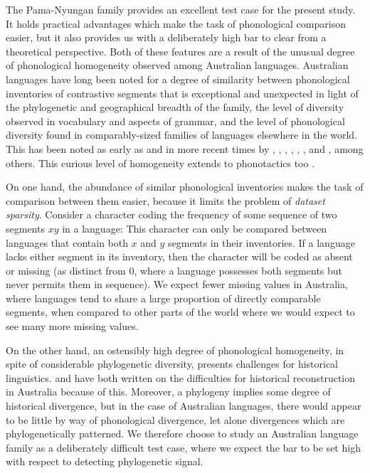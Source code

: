 The Pama-Nyungan family provides an excellent test case for the present study. It holds practical advantages which make the task of phonological comparison easier, but it also provides us with a deliberately high bar to clear from a theoretical perspective. Both of these features are a result of the unusual degree of phonological homogeneity observed among Australian languages. Australian languages have long been noted for a degree of similarity between phonological inventories of contrastive segments that is exceptional and unexpected in light of the phylogenetic and geographical breadth of the family, the level of diversity observed in vocabulary and aspects of grammar, and the level of phonological diversity found in comparably-sized families of languages elsewhere in the world. This has been noted as early as \textcite{schmidt_gliederung_1919} and in more recent times by \textcite{capell_new_1956}, \textcite{voegelin_obtaining_1963}, \textcite{dixon_languages_1980}, \textcite{busby_distribution_1982}, \textcite{hamilton_phonetic_1996}, \textcite{baker_word_2014}, \textcite{bowern_standard_2017} and \textcite{round_segment_2021}, among others. This curious level of homogeneity extends to phonotactics too \autocites{dixon_languages_1980}{hamilton_phonetic_1996}{baker_word_2014}{round_phonotactics_2021}.

On one hand, the abundance of similar phonological inventories makes the task of comparison between them easier, because it limits the problem of \emph{dataset sparsity}. Consider a character coding the frequency of some sequence of two segments \(xy\) in a language: This character can only be compared between languages that contain both \(x\) and \(y\) segments in their inventories. If a language lacks either segment in its inventory, then the character will be coded as absent or missing (as distinct from 0, where a language possesses both segments but never permits them in sequence). We expect fewer missing values in Australia, where languages tend to share a large proportion of directly comparable segments, when compared to other parts of the world where we would expect to see many more missing values.

On the other hand, an ostensibly high degree of phonological homogeneity, in spite of considerable phylogenetic diversity, presents challenges for historical linguistics. \textcite[p.~141]{baker_word_2014} and \textcite[p.~103]{alpher_pama-nyungan:_2004} have both written on the difficulties for historical reconstruction in Australia because of this. Moreover, a phylogeny implies some degree of historical divergence, but in the case of Australian languages, there would appear to be little by way of phonological divergence, let alone divergences which are phylogenetically patterned. We therefore choose to study an Australian language family as a deliberately difficult test case, where we expect the bar to be set high with respect to detecting phylogenetic signal.

